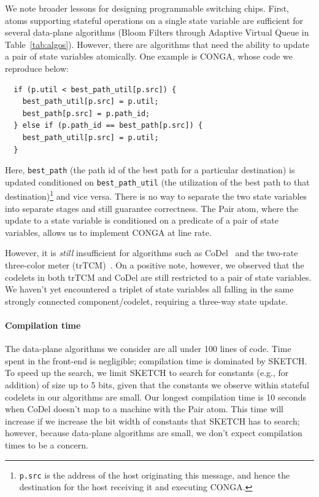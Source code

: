 We note broader lessons for designing programmable switching chips.  First,
atoms supporting stateful operations on a single state variable are sufficient
for several data-plane algorithms (Bloom Filters through Adaptive Virtual Queue
in Table~\ref{tab:algos}). However, there are algorithms that need the ability
to update a pair of state variables atomically. One example is CONGA, whose
code we reproduce below:
\begin{verbatim}
  if (p.util < best_path_util[p.src]) {
    best_path_util[p.src] = p.util;
    best_path[p.src] = p.path_id;
  } else if (p.path_id == best_path[p.src]) {
    best_path_util[p.src] = p.util;
  }
\end{verbatim}
Here, \texttt{best\_path} (the path id of the best path for a particular
destination) is updated conditioned on \texttt{best\_path\_util} (the
utilization of the best path to that destination)\footnote{{\tt p.src} is the
  address of the host originating this message, and hence the destination for
the host receiving it and executing CONGA.} and vice versa. There is no way to
separate the two state variables into separate stages and still guarantee
correctness. The Pair atom, where the update to a state variable is conditioned
on a predicate of a pair of state variables, allows us to implement CONGA at
line rate.  

However, it is \textit{still} insufficient for algorithms such as
CoDel~\cite{codel} and the two-rate three-color meter (trTCM)~\cite{trTCM}.  On
a positive note, however, we observed that the codelets in both trTCM and CoDel
are still restricted to a pair of state variables.  We haven't yet encountered
a triplet of state variables all falling in the same strongly connected
component/codelet, requiring a three-way state update.

\paragraph{Compilation time}
The data-plane algorithms we consider are all under 100 lines of code.  Time
spent in the front-end is negligible; compilation time is dominated by SKETCH.
To speed up the search, we limit SKETCH to search for constants (e.g., for
addition) of size up to 5 bits, given that the constants we observe within
stateful codelets in our algorithms are small. Our longest compilation time is
10 seconds when CoDel doesn't map to a \absmachine machine with the Pair atom.
This time will increase if we increase the bit width of constants that SKETCH
has to search; however, because data-plane algorithms are small, we don't
expect compilation times to be a concern.

